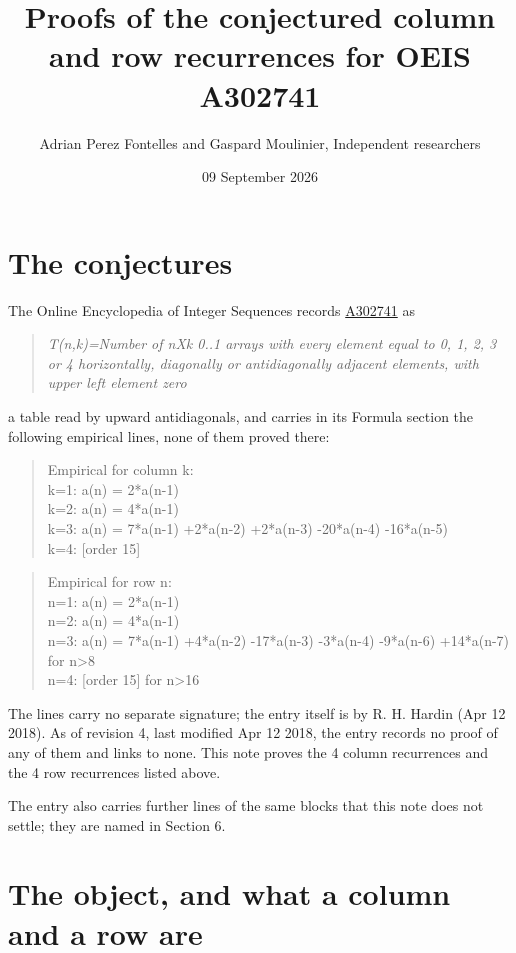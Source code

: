 \documentclass[11pt]{article}
\title{Proofs of the conjectured column and row recurrences for OEIS A302741}
\author{Adrian Perez Fontelles and Gaspard Moulinier, Independent researchers}
\date{09 September 2026}
\theoremstyle{definition}
\begin{document}
\maketitle
\section{The conjectures}

The Online Encyclopedia of Integer Sequences records \href{https://oeis.org/A302741}{A302741} as

\begin{quote}\itshape T(n,k)=Number of nXk 0..1 arrays with every element equal to 0, 1, 2, 3 or 4 horizontally, diagonally or antidiagonally adjacent elements, with upper left element zero\end{quote}

a table read by upward antidiagonals, and carries in its Formula section the following empirical lines, none of them proved there:

\begin{quote}\ttfamily Empirical for column k:\\
k=1: a(n) = 2*a(n-1)\\k=2: a(n) = 4*a(n-1)\\k=3: a(n) = 7*a(n-1) +2*a(n-2) +2*a(n-3) -20*a(n-4) -16*a(n-5)\\k=4: [order 15]\end{quote}

\begin{quote}\ttfamily Empirical for row n:\\
n=1: a(n) = 2*a(n-1)\\n=2: a(n) = 4*a(n-1)\\n=3: a(n) = 7*a(n-1) +4*a(n-2) -17*a(n-3) -3*a(n-4) -9*a(n-6) +14*a(n-7) for n>8\\n=4: [order 15] for n>16\end{quote}

The lines carry no separate signature; the entry itself is by R. H. Hardin (Apr 12 2018). As of revision 4, last modified Apr 12 2018, the entry records no proof of any of them and links to none. This note proves the 4 column recurrences and the 4 row recurrences listed above.

The entry also carries further lines of the same blocks that this note does not settle; they are named in Section 6.

\section{The object, and what a column and a row are}
\end{document}
